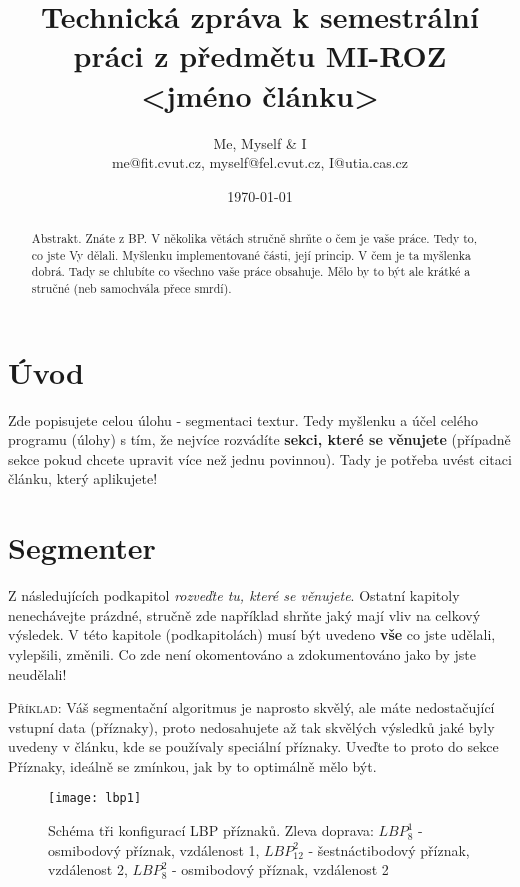 \documentclass[a4paper,10pt,twocolumn]{article}
\title{Technická zpráva k semestrální práci z předmětu MI-ROZ \\ <jméno článku>}
\date{\today}
\author{Me, Myself \& I \\ me@fit.cvut.cz, myself@fel.cvut.cz, I@utia.cas.cz}
\begin{document}
\maketitle
\begin{abstract}
Abstrakt. Znáte z BP. V několika větách stručně shrňte o čem je vaše práce. Tedy to, co jste Vy dělali. Myšlenku implementované části, její princip. V čem je ta myšlenka dobrá. Tady se chlubíte co všechno vaše práce obsahuje. Mělo by to být ale krátké a stručné (neb samochvála přece smrdí). 
\end{abstract}

%
\section{Úvod}

Zde popisujete celou úlohu - segmentaci textur. Tedy myšlenku a účel celého programu (úlohy) s tím, že nejvíce rozvádíte \textbf {sekci, které se věnujete} (případně sekce pokud chcete upravit více než jednu povinnou). Tady je potřeba uvést citaci článku\cite{Zhenhua_LBP_2010}, který aplikujete!
%



%
\section{Segmenter}

Z následujících podkapitol \emph{rozveďte tu, které se věnujete}. Ostatní kapitoly nenechávejte prázdné, stručně zde například shrňte jaký mají vliv na celkový výsledek. V této kapitole (podkapitolách) musí být uvedeno \textbf{vše} co jste udělali, vylepšili, změnili. Co zde není okomentováno a zdokumentováno jako by jste neudělali!

\textsc {Příklad:}  Váš segmentační algoritmus je naprosto skvělý, ale máte nedostačující vstupní data (příznaky), proto nedosahujete až tak skvělých výsledků jaké byly uvedeny v článku, kde se používaly speciální příznaky. Uveďte to proto do sekce Příznaky, ideálně se zmínkou, jak by to optimálně mělo být. 

\begin{figure}[H]
       \begin{center}
              \texttt{[image: lbp1]}
       \end{center}
       \caption{Schéma tři konfigurací LBP příznaků. Zleva doprava: $LBP_8^1$ - osmibodový příznak, vzdálenost 1, $LBP_12^2$ - šestnáctibodový příznak, vzdálenost 2, $LBP_8^2$ - osmibodový příznak, vzdálenost 2}
       \label{fig3}
\end{figure}
\end{document}
